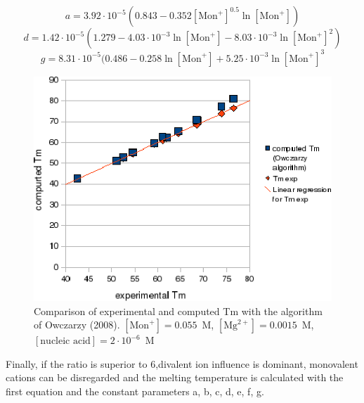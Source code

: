 \documentclass{article}
\begin{document}
\begin{displaymath}
a = 3.92\cdot{}10^{-5} (0.843 - 0.352 [\mbox{Mon}^+]^{0.5} \ln [\mbox{Mon}^+]) 
\end{displaymath}
\begin{displaymath}
d = 1.42\cdot{}10^{-5} (1.279 - 4.03\cdot{}10^{-3} \ln [\mbox{Mon}^+] -
8.03\cdot{}10^{-3} \ln [\mbox{Mon}^+]^{2})
\end{displaymath}
\begin{displaymath}
g = 8.31\cdot{}10^{-5} (0.486 - 0.258 \ln [\mbox{Mon}^+] + 5.25\cdot{}10^{-3}
\ln [\mbox{Mon}^+]^{3} 
\end{displaymath}

\begin{figure}
\caption{Comparison of experimental and computed Tm with the algorithm of Owczarzy (2008). 
$[\mbox{Mon}^+] = 0.055$~M, $[\mbox{Mg}^{2+}] = 0.0015$~M, $[\mbox{nucleic acid}] =
2\cdot{}10^{-6}$~M}
\includegraphics{Owczarzy3.eps}
\end{figure}

Finally, if the ratio is superior to 6,divalent ion influence is dominant, monovalent cations can be 
disregarded and the melting temperature is calculated with the first equation and the constant parameters a, b, c, d,
e, f, g.
\end{document}
